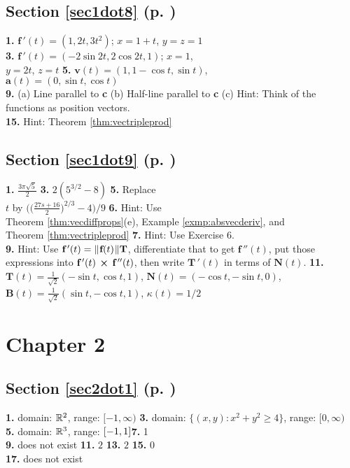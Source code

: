 \begin{multicols}{2}
\subsection*{Section \ref{sec1dot8} (p. \pageref{sec1dot8})}
\textbf{1.} $\textbf{f}\,'(t) = (1,2t,3t^2)$; $x = 1 + t$, $y = z = 1$\\\textbf{3.} $\textbf{f}\,'(t) =
(-2\sin 2t,2\cos 2t,1)$; $x = 1$,\\$y = 2t$, $z = t$ \quad \textbf{5.} $\textbf{v}(t) = (1,1 - \cos t,\sin t)$,\\
$\textbf{a}(t) = (0,\sin t,\cos t)$\\\textbf{9.} (a) Line parallel to \textbf{c} \quad (b) Half-line parallel to
\textbf{c} \quad (c) Hint:  Think of the\\functions as position vectors.\\\textbf{15.} Hint: Theorem
\ref{thm:vectripleprod}
\subsection*{Section \ref{sec1dot9} (p. \pageref{sec1dot9})}
\textbf{1.} $\frac{3\pi \sqrt{5}}{2}$ \quad \textbf{3.} $2 (5^{3/2} - 8)$ \quad \textbf{5.} Replace\\$t$ by
$\biggl( \biggl( \frac{27s + 16}{2} \biggr)^{2/3} - 4 \biggr)\bigg/ 9$ \quad \textbf{6.} Hint: Use\\Theorem
\ref{thm:vecdiffprops}(e), Example \ref{exmp:absvecderiv}, and\\Theorem \ref{thm:vectripleprod} \quad \textbf{7.} Hint:
Use Exercise 6.\\\textbf{9.} Hint: Use $\textbf{f}\,'(t) = \lVert\mspace{1mu}\textbf{f}(t)\mspace{1mu}\rVert\textbf{T}$, differentiate that
to get $\textbf{f}\,''(t)$, put those expressions into $\textbf{f}\,'(t)\, \bm{\times} \,\textbf{f}\,''(t)$, then
write $\textbf{T}\,'(t)$ in terms of $\textbf{N}(t)$. \quad \textbf{11.} $\textbf{T}(t) = \frac{1}{\sqrt{2}}
(-\sin t,\cos t,1)$, $\textbf{N}(t) = (-\cos t,-\sin t,0)$, $\textbf{B}(t) = \frac{1}{\sqrt{2}}(\sin t,-\cos t,1)$,
$\kappa(t) = 1/2$
\section*{Chapter 2}
\subsection*{Section \ref{sec2dot1} (p. \pageref{sec2dot1})}
\textbf{1.} domain: $\mathbb{R}^{2}$, range: $\lbrack -1,\infty )$\quad
\textbf{3.} domain: $\lbrace (x,y): x^2 + y^2 \ge 4 \rbrace$, range: $\lbrack 0,\infty)$\\\textbf{5.} domain:
$\mathbb{R}^{3}$, range: $\lbrack -1,1 \rbrack$\quad\textbf{7.} 1\\\textbf{9.} does not exist\quad
\textbf{11.} $2$\quad
\textbf{13.} $2$\quad
\textbf{15.} $0$\\\textbf{17.} does not exist

\end{multicols}
